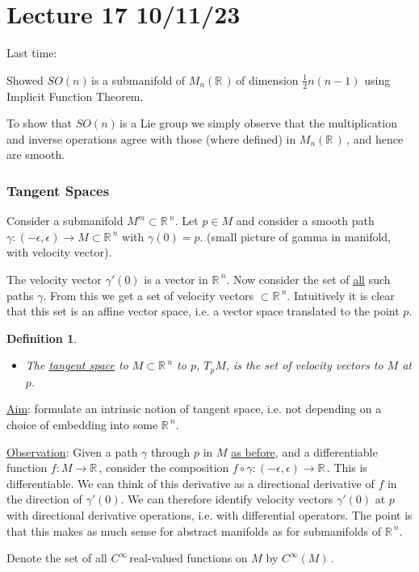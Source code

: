 \documentclass[12pt,a4paper]{article}
\newcommand{\rR}{\ensuremath{\mathbb{R}\,}}
\newcommand{\cinf}{\ensuremath{C^{\infty}\,}}
\newcommand{\cinfm}{\ensuremath{C^{\infty}(M)\,}}
\newcommand{\tpm}{\ensuremath{T_p M}}
\newcommand{\mnr}{\ensuremath{M_n(\rR)\,}}
\newcommand{\gson}{\ensuremath{SO(n)\,}}
\newcommand{\ul}[1]{\underline{#1}}
\newtheorem{defn}[thm]{Definition}
\begin{document}
\section{Lecture 17 10/11/23}
Last time:

Showed \gson is a submanifold of \mnr of dimension $\frac{1}{2}n(n-1)$ using Implicit Function Theorem.

To show that \gson is a Lie group we simply observe that the multiplication and inverse operations agree with those (where defined) in \mnr, and hence are smooth.

\subsubsection{Tangent Spaces}

Consider a submanifold $M^m\subset \rR^n$. Let $p\in M$ and consider a smooth path $\gamma:(-\epsilon,\epsilon)\to M\subset\rR^n$ with $\gamma(0)=p$. (small picture of gamma in manifold, with velocity vector).

The velocity vector $\gamma'(0)$ is  a vector in $\rR^n$. Now consider the set of \ul{all} such paths $\gamma$. From this we get a set of velocity vectors $\subset \rR^n$. Intuitively it is clear that this set is an affine vector space, i.e. a vector space translated to the point $p$.

\begin{defn}
\begin{itemize}
\item[(a)] The \ul{tangent space} to $M\subset\rR^n$ to $p$, \tpm , is the set of velocity vectors to $M$ at $p$.
\end{itemize}
\end{defn}

\ul{Aim}: formulate an intrinsic notion of tangent space, i.e. not depending on a choice of embedding into some $\rR^n$.

\ul{Observation}: Given a path $\gamma$ through $p$ in $M$ \ul{as before}, and a differentiable function $f:M\to \rR$, consider the composition $f\circ \gamma:(-\epsilon,\epsilon)\to \rR$. This is differentiable. We can think of this derivative as a directional derivative of $f$ in the direction of $\gamma'(0)$. We can therefore identify velocity vectors $\gamma'(0)$ at $p$ with directional derivative operations, i.e. with differential operators. The point is that this makes as much sense for abstract manifolds as for submanifolds of $\rR^n$.

Denote the set of all \cinf real-valued functions on $M$ by  \cinfm. 
\end{document}
